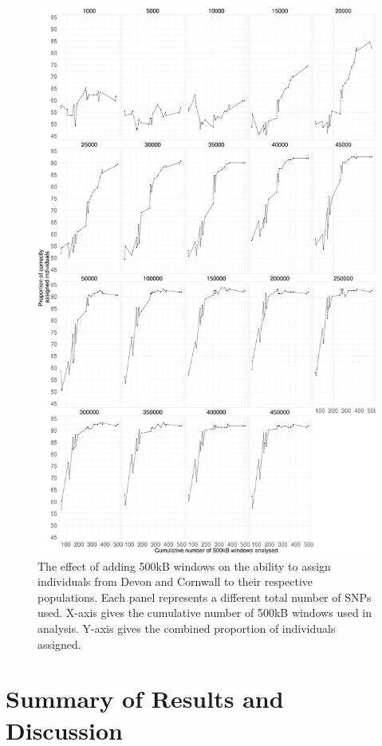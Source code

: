 \begin{figure}[htp]
    \centering
    \includegraphics[width=1.0\textwidth]{../images/chapter1/cumulative_windows_val.pdf}
    \caption{The effect of adding 500kB windows on the ability to assign individuals from Devon and Cornwall to their respective populations. Each panel represents a different total number of SNPs used. X-axis gives the cumulative number of 500kB windows used in analysis. Y-axis gives the combined proportion of individuals assigned.}
    \label{fig:cumulative_windows_val}
\end{figure}


\section{Summary of Results and Discussion}

